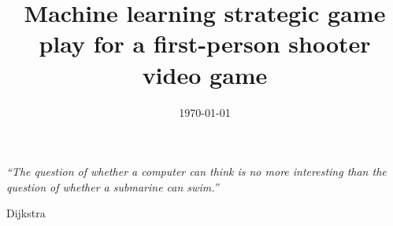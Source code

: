\documentclass[a4paper, 11pt, oneside]{Thesis}  %
\begin{document}
\frontmatter	  %

\title  {Machine learning strategic game play for a first-person shooter video game}
\addresses  {\groupname\\\deptname\\\univname}  %
\date       {\today}
\subject    {Learning in games}

\maketitle

\null\vfill
\pagestyle{empty}  %
\newpage

\fancyhead{}  %
\rhead{\thepage}  %
\lhead{}  %

\pagestyle{fancy}  %
\pagestyle{empty}  %

\null\vfill
\textit{``The question of whether a computer can think is no more interesting
than the question of whether a submarine can swim.''}

\begin{flushright}
Dijkstra
\end{flushright}

\vfill\vfill\vfill\vfill\vfill\vfill\null
\clearpage  %
\end{document}
